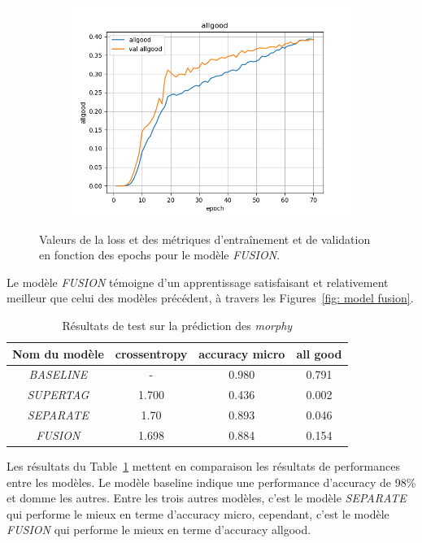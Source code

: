 \documentclass[a4paper]{article}
\begin{document}
\begin{figure}[H]
\begin{subfigure}{0.32\textwidth}
        \includegraphics[width=\linewidth]{../logs/fusion/allgood.png}
    \end{subfigure}
    \caption{Valeurs de la loss et des métriques d'entraînement et de validation en fonction des epochs 
            pour le modèle \textit{FUSION}.}
    \label{fig: results fusion}
\end{figure}

Le modèle \textit{FUSION} témoigne d'un apprentissage satisfaisant et relativement meilleur que celui des modèles précédent, à 
travers les Figures~\ref{fig: model fusion}.


\begin{table}[H]
    \centering
    \begin{tabular}{|c|c|c|c|}
        \hline
         Nom du modèle & crossentropy & accuracy micro & all good\\
         \hline
         \textit{BASELINE}& - & 0.980 & 0.791 \\
         \hline
         \textit{SUPERTAG}& 1.700 & 0.436 & 0.002\\
         \hline
         \textit{SEPARATE}& 1.70 & 0.893 & 0.046\\
         \hline
         \textit{FUSION}& 1.698 & 0.884 & 0.154 \\
         \hline
    \end{tabular}
    \caption{Résultats de test sur la prédiction des \textit{morphy}}
    \label{tab: test morphy}
\end{table}

Les résultats du Table~\ref{tab: test morphy} mettent en comparaison les résultats de performances entre les modèles.
Le modèle baseline indique une performance d'accuracy de 98\% et domme les autres.
Entre les trois autres modèles, c'est le modèle \textit{SEPARATE} qui performe le mieux en terme d'accuracy micro, cependant,
c'est le modèle \textit{FUSION} qui performe le mieux en terme d'accuracy allgood. 
\end{document}
